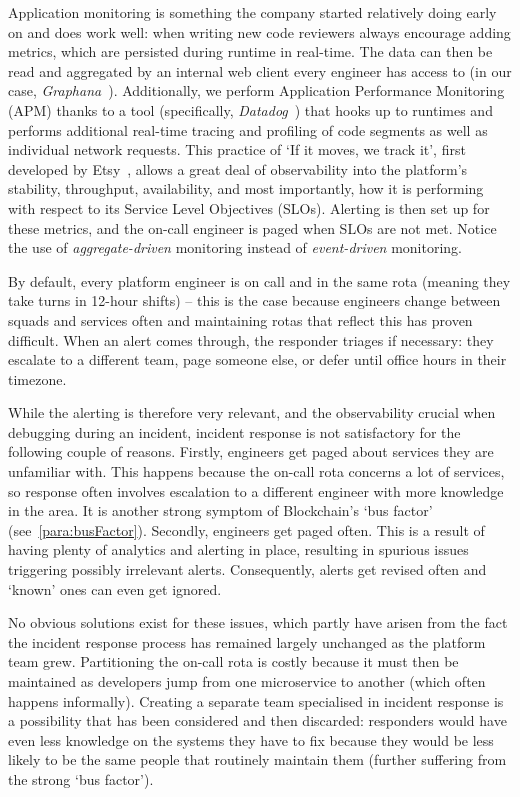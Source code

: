\documentclass[conference]{IEEEtran}
\begin{document}
    Application monitoring is something the company started relatively doing early on and does work well: when writing new code reviewers always encourage adding metrics, which are persisted during runtime in real-time.
    The data can then be read and aggregated by an internal web client every engineer has access to (in our case, \textit{Graphana}~\cite{grafana}).
    Additionally, we perform Application Performance Monitoring (APM) thanks to a tool (specifically, \textit{Datadog}~\cite{datadogApm}) that hooks up to runtimes and performs additional real-time tracing and profiling of code segments as well as individual network requests.
    This practice of `If it moves, we track it', first developed by Etsy~\cite{etsyStatsd}, allows a great deal of observability into the platform's stability, throughput, availability, and most importantly, how it is performing with respect to its Service Level Objectives (SLOs).
    Alerting is then set up for these metrics, and the on-call engineer is paged when SLOs are not met.
    Notice the use of \emph{aggregate-driven} monitoring instead of \emph{event-driven} monitoring.

    By default, every platform engineer is on call and in the same rota (meaning they take turns in 12-hour shifts) -- this is the case because engineers change between squads and services often and maintaining rotas that reflect this has proven difficult.
    When an alert comes through, the responder triages if necessary: they escalate to a different team, page someone else, or defer until office hours in their timezone.

    While the alerting is therefore very relevant, and the observability crucial when debugging during an incident, incident response is not satisfactory for the following couple of reasons.
    Firstly, engineers get paged about services they are unfamiliar with.
    This happens because the on-call rota concerns a lot of services, so response often involves escalation to a different engineer with more knowledge in the area.
    It is another strong symptom of Blockchain's `bus factor' (see~\ref{para:busFactor}).
    Secondly, engineers get paged often.
    This is a result of having plenty of analytics and alerting in place, resulting in spurious issues triggering possibly irrelevant alerts.
    Consequently, alerts get revised often and `known' ones can even get ignored.

    No obvious solutions exist for these issues, which partly have arisen from the fact the incident response process has remained largely unchanged as the platform team grew.
    Partitioning the on-call rota is costly because it must then be maintained as developers jump from one microservice to another (which often happens informally).
    Creating a separate team specialised in incident response is a possibility that has been considered and then discarded: responders would have even less knowledge on the systems they have to fix because they would be less likely to be the same people that routinely maintain them (further suffering from the strong `bus factor').
\end{document}
